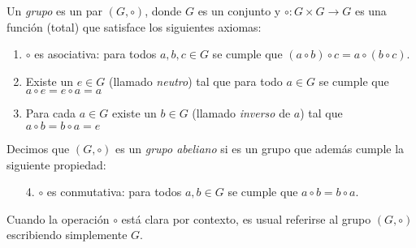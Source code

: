 

\begin{definition}
Un \emph{grupo} es un par $(G,\circ)$, donde $G$ es un conjunto y $\circ \colon G\times G\to G$ es una función (total) que satisface los siguientes axiomas:
\begin{enumerate}
	\item $\circ$ es asociativa: para todos $a,b,c \in G$ se cumple que $(a \circ b) \circ c = a \circ (b
\circ c)$.

	\item Existe un $e \in G$ (llamado \emph{neutro}) tal que para todo $a \in G$ se cumple que $a \circ e = e \circ a = a$

   \item Para cada $a \in G$ existe un $b \in G$ (llamado \emph{inverso} de $a$) tal que $a \circ b 	= b \circ a = e$
\end{enumerate}
Decimos que $(G,\circ)$ es un \emph{grupo abeliano} si es un grupo que además cumple la siguiente propiedad:
\begin{enumerate}
	\item[4.] $\circ$ es conmutativa: para todos $a,b\in G$ se cumple que $a\circ b = b\circ a$. 
\end{enumerate}
\end{definition}

Cuando la operación $\circ$ está clara por contexto, es usual referirse al grupo $(G, \circ)$ escribiendo simplemente $G$. 

